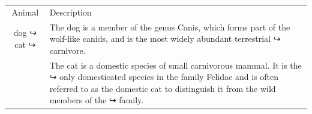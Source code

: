 \documentclass{article}
\begin{document}
 \begin{tabular}{cl}
 Animal & Description \\
 dog
 ↪
 cat
 ↪
 & The dog is a member of the genus Canis, which forms
 part of the
 wolf-like canids, and is the most widely abundant
 terrestrial
 ↪
 carnivore. \\
 & The cat is a domestic species of small carnivorous
 mammal. It is the
 ↪
 only domesticated species in the family Felidae and
 is often referred
 to as the domestic cat to distinguish it from the
 wild members of the
 ↪
 family. \\
 \end{tabular}
 
\end{document}
